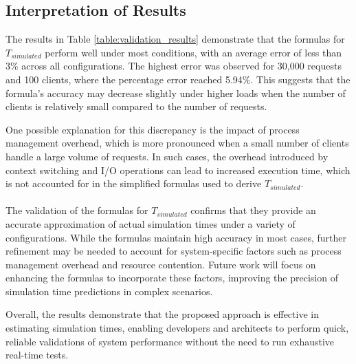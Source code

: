 \begin{table}[h!]
    \centering
    \caption{Comparison of predicted and actual simulation times for varying numbers of requests and clients}
    \label{table:validation_results}
\end{table}

\subsection{Interpretation of Results}

The results in Table \ref{table:validation_results} demonstrate that the formulas for \( T_{simulated} \) perform well under most conditions, with an average error of less than 3\% across all configurations. The highest error was observed for 30,000 requests and 100 clients, where the percentage error reached 5.94\%. This suggests that the formula’s accuracy may decrease slightly under higher loads when the number of clients is relatively small compared to the number of requests.

One possible explanation for this discrepancy is the impact of process management overhead, which is more pronounced when a small number of clients handle a large volume of requests. In such cases, the overhead introduced by context switching and I/O operations can lead to increased execution time, which is not accounted for in the simplified formulas used to derive \( T_{simulated} \).
\\ \\
The validation of the formulas for \( T_{simulated} \) confirms that they provide an accurate approximation of actual simulation times under a variety of configurations. While the formulas maintain high accuracy in most cases, further refinement may be needed to account for system-specific factors such as process management overhead and resource contention. Future work will focus on enhancing the formulas to incorporate these factors, improving the precision of simulation time predictions in complex scenarios.

Overall, the results demonstrate that the proposed approach is effective in estimating simulation times, enabling developers and architects to perform quick, reliable validations of system performance without the need to run exhaustive real-time tests.
